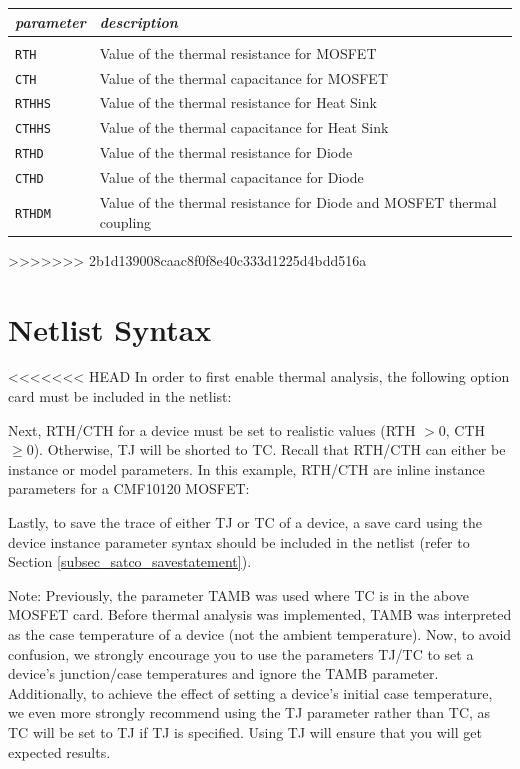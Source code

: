 \begin{tabular}{l l}
\textit{parameter} & \textit{description} \\ \hline \\ \vspace{-0.8\parskip}
\texttt{RTH} & Value of the thermal resistance for MOSFET \\
\texttt{CTH} & Value of the thermal capacitance for MOSFET \\
\texttt{RTHHS} & Value of the thermal resistance for Heat Sink \\
\texttt{CTHHS} & Value of the thermal capacitance for Heat Sink \\
\texttt{RTHD} & Value of the thermal resistance for Diode \\
\texttt{CTHD} & Value of the thermal capacitance for Diode \\
\texttt{RTHDM} & Value of the thermal resistance for Diode and MOSFET thermal coupling \\
\end{tabular}
>>>>>>> 2b1d139008caac8f0f8e40c333d1225d4bdd516a

\section{Netlist Syntax}
\label{subsec_sceadm_thermalnetsyntax}

<<<<<<< HEAD
In order to first enable thermal analysis, the following option card must be included in the netlist:


Next, RTH/CTH for a device must be set to realistic values (RTH $> 0$, CTH $\geq 0$). Otherwise, TJ will be shorted to TC. Recall that RTH/CTH can either be instance or model parameters. In this example, RTH/CTH are inline instance parameters for a CMF10120 MOSFET:


Lastly, to save the trace of either TJ or TC of a device, a save card using the device instance parameter syntax should be included in the netlist (refer to Section \ref{subsec_satco_savestatement}).


Note: Previously, the parameter TAMB was used where TC is in the above MOSFET card. Before thermal analysis was implemented, TAMB was interpreted as the case temperature of a device (not the ambient temperature). Now, to avoid confusion, we strongly encourage you to use the parameters TJ/TC to set a device's junction/case temperatures and ignore the TAMB parameter. Additionally, to achieve the effect of setting a device's initial case temperature, we even more strongly recommend using the TJ parameter rather than TC, as TC will be set to TJ if TJ is specified. Using TJ will ensure that you will get expected results.
	
